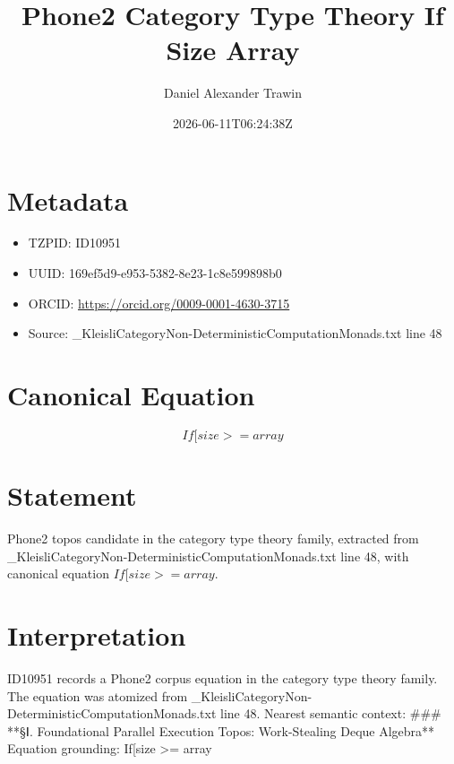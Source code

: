 \documentclass[11pt]{article}
\title{Phone2 Category Type Theory If Size Array}
\author{Daniel Alexander Trawin}
\date{2026-06-11T06:24:38Z}
\begin{document}
\maketitle
\section*{Metadata}
\begin{itemize}
\item TZPID: ID10951
\item UUID: 169ef5d9-e953-5382-8e23-1c8e599898b0
\item ORCID: \url{https://orcid.org/0009-0001-4630-3715}
\item Source: _KleisliCategoryNon-DeterministicComputationMonads.txt line 48
\end{itemize}
\section*{Canonical Equation}
\[
If[size >= array
\]
\section*{Statement}
Phone2 topos candidate in the category type theory family, extracted from _KleisliCategoryNon-DeterministicComputationMonads.txt line 48, with canonical equation $If[size >= array$.
\section*{Interpretation}
ID10951 records a Phone2 corpus equation in the category type theory family. The equation was atomized from _KleisliCategoryNon-DeterministicComputationMonads.txt line 48. Nearest semantic context: ### **§Ⅰ. Foundational Parallel Execution Topos: Work-Stealing Deque Algebra** Equation grounding: If[size >= array
\end{document}

